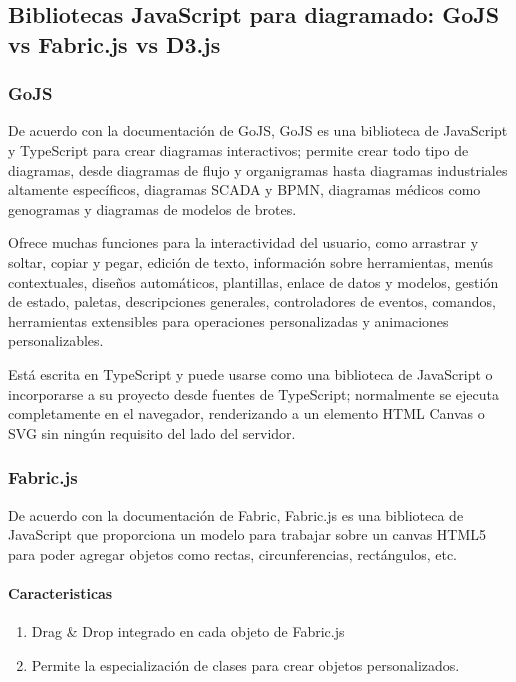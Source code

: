 \subsection{Bibliotecas JavaScript para diagramado: GoJS vs Fabric.js vs D3.js}
\subsubsection*{GoJS}
De acuerdo con la documentación de GoJS\cite{noauthor_gojs_nodate}, GoJS es una biblioteca de JavaScript y TypeScript para crear diagramas interactivos; permite crear todo tipo de diagramas, desde diagramas de flujo y organigramas hasta diagramas industriales altamente específicos, diagramas SCADA y BPMN, diagramas médicos como genogramas y diagramas de modelos de brotes. 


Ofrece muchas funciones para la interactividad del usuario, como arrastrar y soltar, copiar y pegar, edición de texto, información sobre herramientas, menús contextuales, diseños automáticos, plantillas, enlace de datos y modelos, gestión de estado, paletas, descripciones generales, controladores de eventos, comandos, herramientas extensibles para operaciones personalizadas y animaciones personalizables.


Está escrita en TypeScript y puede usarse como una biblioteca de JavaScript o incorporarse a su proyecto desde fuentes de TypeScript; normalmente se ejecuta completamente en el navegador, renderizando a un elemento HTML Canvas o SVG sin ningún requisito del lado del servidor.


\subsubsection*{Fabric.js}

De acuerdo con la documentación de Fabric\cite{noauthor_fabric_2020}, Fabric.js es una biblioteca de JavaScript que proporciona un modelo para trabajar sobre un canvas HTML5 para poder agregar objetos como rectas, circunferencias, rectángulos, etc.

\paragraph*{Caracteristicas}
\begin{enumerate}
    \item Drag \& Drop integrado en cada objeto de Fabric.js
    \item Permite la especialización de clases para crear objetos personalizados.
\end{enumerate}


